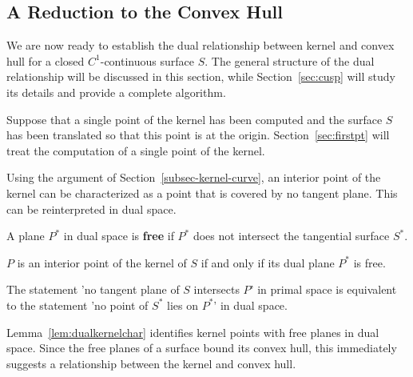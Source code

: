 \documentclass{acmsiggraph}
\begin{document}
\subsection{A Reduction to the Convex Hull}
\label{sec:reduction}

We are now ready to establish the dual relationship between kernel and convex hull
for a closed $C^1$-continuous surface $S$.
The general structure of the dual relationship will be discussed in this section,
while Section~\ref{sec:cusp} will study its details and provide a complete algorithm.

Suppose that a single point of the kernel has been computed and the surface $S$
has been translated so that this point is at the origin.
Section~\ref{sec:firstpt} will treat the computation of a single point of the kernel.

Using the argument of Section~\ref{subsec-kernel-curve},
an interior point of the kernel can be characterized as a point that is covered by
no tangent plane.
This can be reinterpreted in dual space.

\begin{defn2}
A plane $P^*$ in dual space is {\bf free} if $P^*$ does not intersect the tangential surface $S^*$.
\end{defn2}

\begin{lemma}
\label{lem:dualkernelchar}
$P$ is an interior point of the kernel of $S$ if and only if 
its dual plane $P^*$ is free.
\end{lemma}
\prf
The statement 'no tangent plane of $S$ intersects $P$' in primal space
is equivalent to the statement 'no point of $S^*$ lies on $P^*$' in dual space.
\QED

Lemma~\ref{lem:dualkernelchar} identifies kernel points
with free planes in dual space.
Since the free planes of a surface bound its convex hull,
this immediately suggests a relationship between the kernel and convex hull.
\end{document}
